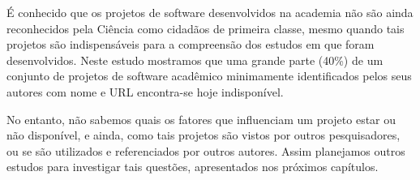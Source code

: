 É conhecido que os projetos de software desenvolvidos na academia não são ainda
reconhecidos pela Ciência como cidadãos de primeira classe, mesmo quando tais
projetos são indispensáveis para a compreensão dos estudos em que foram
desenvolvidos. Neste estudo mostramos que uma grande parte (40\%) de um
conjunto de projetos de software acadêmico minimamente identificados pelos seus
autores com nome e URL encontra-se hoje indisponível.

No entanto, não sabemos quais os fatores que influenciam um projeto estar ou não
disponível, e ainda, como tais projetos são vistos por outros pesquisadores, ou se
são utilizados e referenciados por outros autores. Assim planejamos outros
estudos para investigar tais questões, apresentados nos próximos capítulos.

